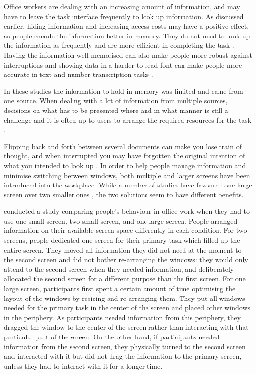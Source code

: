 Office workers are dealing with an increasing amount of information, and may have to leave the task interface frequently to look up information. As discussed earlier, hiding information and increasing access costs may have a positive effect, as people encode the information better in memory. They do not need to look up the information as frequently and are more efficient in completing the task \citep[e.g.][]{Waldron2011}. Having the information well-memorised can also make people more robust against interruptions \citep{Morgan2009} and showing data in a harder-to-read font can make people more accurate in text and number transcription tasks \citep{Soboczenski2013}.

In these studies the information to hold in memory was limited and came from one source. When dealing with a lot of information from multiple sources, decisions on what has to be presented where and in what manner is still a challenge and it is often up to users to arrange the required resources for the task \citep{Bardram2006, Grudin2001}.

Flipping back and forth between several documents can make you lose train of thought, and when interrupted you may have forgotten the original intention of what you intended to look up \citep{Grudin2001}.  In order to help people manage information and minimise switching between windows, both multiple and larger screens have been introduced into the workplace. While a number of studies have favoured one large screen over two smaller ones \citep[e.g.][]{Bi2009}, the two solutions seem to have different benefits.

\citet{Bi2009} conducted a study comparing people's behaviour in office work when they had to use one small screen, two small screen, and one large screen. People arranged information on their available screen space differently in each condition. For two screens, people dedicated one screen for their primary task which filled up the entire screen. They moved all information they did not need at the moment to the second screen and did not bother re-arranging the windows: they would only attend to the second screen when they needed information, and deliberately allocated the second screen for a different purpose than the first screen. For one large screen, participants first spent a certain amount of time optimising the layout of the windows by resizing and re-arranging them. They put all windows needed for the primary task in the center of the screen and placed other windows in the periphery.  As participants needed information from this periphery, they dragged the window to the center of the screen rather than interacting with that particular part of the screen. On the other hand, if participants needed information from the second screen, they physically turned to the second screen and interacted with it but did not drag the information to the primary screen, unless they had to interact with it for a longer time.  

